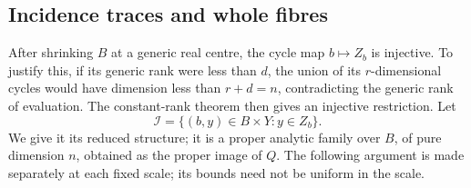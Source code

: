 \subsection{Incidence traces and whole fibres}

After shrinking $B$ at a generic real centre, the cycle map $b\mapsto Z_b$ is injective. To justify this, if its generic rank were less than $d$, the union of its $r$-dimensional cycles would have dimension less than $r+d=n$, contradicting the generic rank of evaluation. The constant-rank theorem then gives an injective restriction. Let
\[
 \mathcal{I}=\{(b,y)\in B\times Y:y\in Z_b\}.
\]
We give it its reduced structure; it is a proper analytic family over $B$, of pure dimension $n$, obtained as the proper image of $Q$. The following argument is made separately at each fixed scale; its bounds need not be uniform in the scale.

